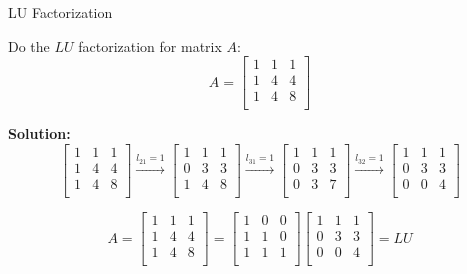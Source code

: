 \documentclass{beamer}
\begin{document}
\begin{frame}{LU Factorization}
\begin{examples}
    Do the $LU$ factorization for matrix $A$:
    \begin{equation*}
        A=\left[ \begin{matrix}
            1&		1&		1\\
            1&		4&		4\\
            1&		4&		8\\
        \end{matrix} \right]
    \end{equation*}
\end{examples}

\textbf{Solution:}
\begin{equation*}
    \left[ \begin{matrix}
        1&		1&		1\\
        1&		4&		4\\
        1&		4&		8\\
    \end{matrix} \right] \xrightarrow{l_{21}=1}\left[ \begin{matrix}
        1&		1&		1\\
        0&		3&		3\\
        1&		4&		8\\
    \end{matrix} \right] \xrightarrow{l_{31}=1}\left[ \begin{matrix}
        1&		1&		1\\
        0&		3&		3\\
        0&		3&		7\\
    \end{matrix} \right] \xrightarrow{l_{32}=1}\left[ \begin{matrix}
        1&		1&		1\\
        0&		3&		3\\
        0&		0&		4\\
    \end{matrix} \right]
\end{equation*}

\begin{equation*}
    A=\left[ \begin{matrix}
        1&		1&		1\\
        1&		4&		4\\
        1&		4&		8\\
    \end{matrix} \right] =\left[ \begin{matrix}
        1&		0&		0\\
        1&		1&		0\\
        1&		1&		1\\
    \end{matrix} \right] \left[ \begin{matrix}
        1&		1&		1\\
        0&		3&		3\\
        0&		0&		4\\
    \end{matrix} \right]=LU
\end{equation*}
\end{frame}
\end{document}
